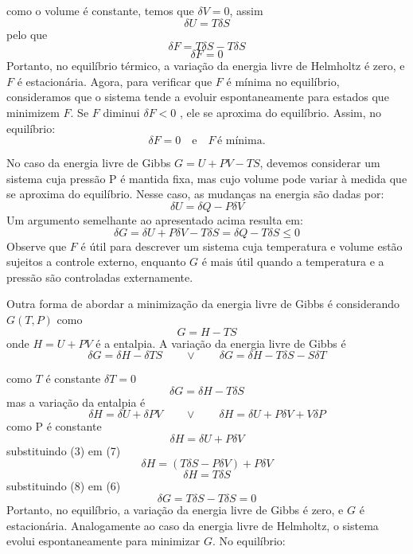 \documentclass[12pt]{article}
\begin{document}
\begin{itemize}
     como o volume é constante, temos que $\delta V = 0$, assim
     \[
     \delta U = T \delta S 
     \]
     pelo que 
     \[
     \delta F = T \delta S - T \delta S
     \]
     \[
      \delta F = 0
     \]
     Portanto, no equilíbrio térmico, a variação da energia livre de Helmholtz é zero, e  $F$ é estacionária. Agora, para verificar que  $F$ é mínima no equilíbrio, consideramos que o sistema tende a evoluir espontaneamente para estados que minimizem  $F$. Se $F$  diminui $\delta F < 0$ , ele se aproxima do equilíbrio. Assim, no equilíbrio:
     \[
     \delta F = 0 \quad \text{e} \quad F \, \text{é mínima}.
     \]

     No caso da energia livre de Gibbs $G = U + PV - TS$, devemos considerar um sistema cuja pressão P é mantida fixa, mas cujo volume pode variar à medida que se aproxima do equilíbrio. Nesse caso, as mudanças na energia são dadas por:
     \begin{equation}
         \delta U = \delta Q - P \delta V
     \end{equation}
     Um argumento semelhante ao apresentado acima resulta em:
     \begin{equation}
         \delta G = \delta U + P \delta V - T \delta S = \delta Q - T \delta S \leq 0
     \end{equation}
     Observe que $F$ é útil para descrever um sistema cuja temperatura e volume estão sujeitos a controle externo, enquanto $G$ é mais útil quando a temperatura e a pressão são controladas externamente.

     Outra forma de abordar a minimização da energia livre de Gibbs é considerando $G(T,P)$ como
     \[
     G = H - T S
     \]
    onde $H = U + P V$ é a entalpia.
    A variação da energia livre de Gibbs é
    \[
    \delta G = \delta H - \delta TS \quad \quad \vee \quad \quad \delta G =  \delta H - T \delta S - S \delta T
    \]
    
    como $T$ é constante $\delta T = 0$
    \begin{equation}
        \delta G = \delta H - T \delta S
    \end{equation}
    mas a variação da entalpia é 
    \[
    \delta H = \delta U + \delta PV \quad \quad \vee \quad \quad \delta H = \delta U + P \delta V + V \delta P
    \]
    como P é constante
    \begin{equation}
        \delta H = \delta U + P \delta V
    \end{equation}
    substituindo (3) em (7)
    \[
     \delta H = (T \delta S - P \delta V) + P \delta V
    \]
    \begin{equation}
       \delta H = T \delta S
    \end{equation}
    substituindo (8) em (6)
    \[
    \delta G = T \delta S - T \delta S = 0
    \]
    Portanto, no equilíbrio, a variação da energia livre de Gibbs é zero, e $G$ é estacionária. Analogamente ao caso da energia livre de Helmholtz, o sistema evolui espontaneamente para minimizar $G$. No equilíbrio:
    

\end{itemize}
\end{document}
